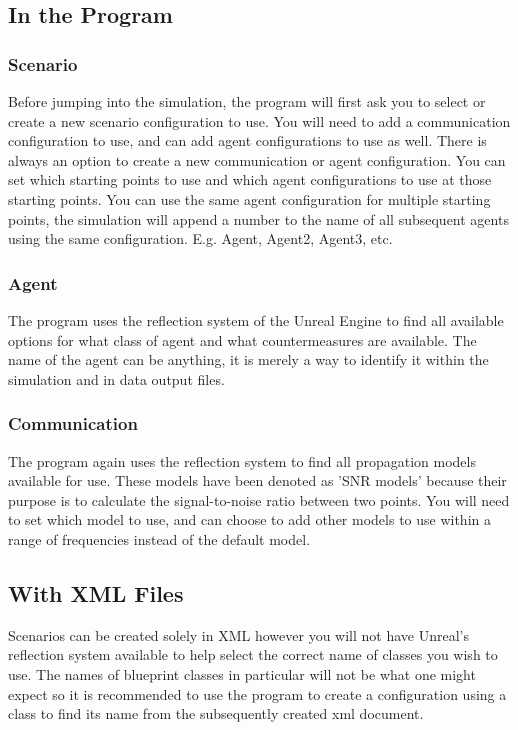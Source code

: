 \documentclass[../main.tex]{subfiles}
\begin{document}
\subsection{In the Program}

\subsubsection{Scenario}
Before jumping into the simulation, the program will first ask you to select or create a new scenario configuration to use.
You will need to add a communication configuration to use, and can add agent configurations to use as well.
There is always an option to create a new communication or agent configuration.
You can set which starting points to use and which agent configurations to use at those starting points.
You can use the same agent configuration for multiple starting points, the simulation will append a number to the name of all subsequent agents using the same configuration.
E.g. Agent, Agent2, Agent3, etc.

\subsubsection{Agent}
The program uses the reflection system of the Unreal Engine to find all available options for what class of agent and what countermeasures are available.
The name of the agent can be anything, it is merely a way to identify it within the simulation and in data output files.

\subsubsection{Communication}
The program again uses the reflection system to find all propagation models available for use.
These models have been denoted as 'SNR models' because their purpose is to calculate the signal-to-noise ratio between two points.
You will need to set which model to use, and can choose to add other models to use within a range of frequencies instead of the default model.

\subsection{With XML Files}
Scenarios can be created solely in XML however you will not have Unreal's reflection system available to help select the correct name of classes you wish to use.
The names of blueprint classes in particular will not be what one might expect so it is recommended to use the program to create a configuration using a class to find its name from the subsequently created xml document.
\end{document}
